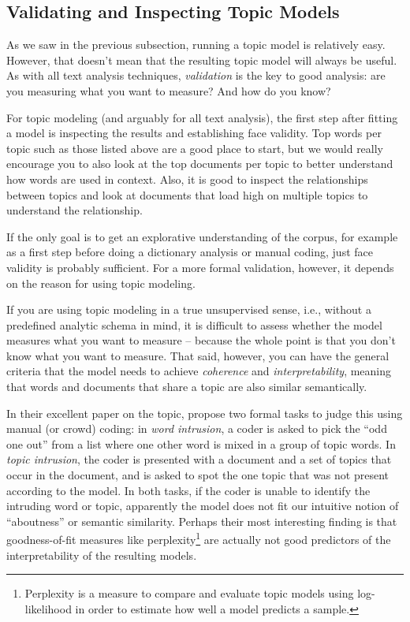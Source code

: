 \subsection{Validating and Inspecting Topic Models}\label{sec:ldavalidate}

As we saw in the previous subsection, running a topic model is relatively easy.
However, that doesn't mean that the resulting topic model will always be useful.
As with all text analysis techniques, \emph{validation} is the key to good analysis:
are you measuring what you want to measure? And how do you know?

For topic modeling (and arguably for all text analysis),
the first step after fitting a model is inspecting the results and establishing face validity.
Top words per topic such as those listed above are a good place to start,
but we would really encourage you to also look at the top documents per topic to better understand how words are used in context.
Also, it is good to inspect the relationships between topics and look at documents that load high on multiple topics to understand the relationship.

If the only goal is to get an explorative understanding of the corpus,
for example as a first step before doing a dictionary analysis or manual coding,
just face validity is probably sufficient.
For a more formal validation, however, it depends on the reason for using topic modeling.

If you are using topic modeling in a true unsupervised sense, i.e., without a predefined analytic schema in mind,
it is difficult to assess whether the model measures what you want to measure --
because the whole point is that you don't know what you want to measure.
That said, however, you can have the general criteria that the model needs to achieve \emph{coherence}
and \emph{interpretability}, meaning that words and documents that share a topic
are also similar semantically.

In their excellent paper on the topic, \citet{chang09} propose two formal tasks to judge this
using manual (or crowd) coding: in \emph{word intrusion}, a coder is asked to pick the ``odd one out'' from a list
where one other word is mixed in a group of topic words.
In \emph{topic intrusion}, the coder is presented with a document and a set of topics that occur in the document,
and is asked to spot the one topic that was not present according to the model.
In both tasks, if the coder is unable to identify the intruding word or topic, apparently the model does not fit
our intuitive notion of ``aboutness'' or semantic similarity.
Perhaps their most interesting finding is that goodness-of-fit measures like perplexity\footnote{Perplexity is a measure to compare and evaluate topic models using log-likelihood in order to estimate how well a model predicts a sample.}
are actually not good predictors of the interpretability of the resulting models.

